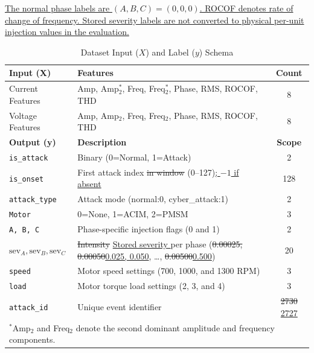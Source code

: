 \documentclass[conference,onecolumn,letterpaper]{IEEEtran} %
\providecommand{\DIFadd}[1]{{\protect\color{blue} \sf #1}} %
\providecommand{\DIFdel}[1]{{\protect\color{red} \scriptsize #1}} %
\providecommand{\DIFaddbegin}{} %
\providecommand{\DIFaddend}{} %
\providecommand{\DIFdelbegin}{} %
\providecommand{\DIFdelend}{} %
\providecommand{\DIFaddFL}[1]{\DIFadd{#1}} %
\providecommand{\DIFdelFL}[1]{\DIFdel{#1}} %
\providecommand{\DIFaddbeginFL}{} %
\providecommand{\DIFaddendFL}{} %
\providecommand{\DIFdelbeginFL}{} %
\providecommand{\DIFdelendFL}{} %
\renewcommand{\DIFadd}[1]{{\protect\color{blue}\protect\uline{#1}}}
\renewcommand{\DIFdel}[1]{{\protect\color{red}\protect\sout{#1}}}
\begin{document}
\DIFaddbegin \DIFadd{The normal phase labels are $(A,B,C)=(0,0,0)$. ROCOF denotes rate of change of frequency. Stored severity labels are not converted to physical per-unit injection values in the evaluation.
}\DIFaddend

\DIFdelbegin %
\DIFdelendFL \DIFaddbeginFL \begin{table}[!t]
\DIFaddendFL \centering
\caption{Dataset Input ($X$) and Label ($y$) Schema}
\label{tab:dataset_schema}
\begin{tabular}{l|l|c}
\hline
\textbf{Input (X)} & \textbf{Features} & \textbf{Count} \\ \hline
Current Features & Amp, Amp$_2^*$, Freq, Freq$_2^*$, Phase, RMS, ROCOF, THD & 8 \\
Voltage Features & Amp, Amp$_2$, Freq, Freq$_2$, Phase, RMS, ROCOF, THD & 8 \\ \hline
\textbf{Output (y)} & \textbf{Description} & \textbf{Scope} \\ 
\hline
\texttt{is\_attack} & Binary (0=Normal, 1=Attack) & 2 \\
\texttt{is\_onset} & First attack index \DIFdelbeginFL \DIFdelFL{in window }\DIFdelendFL (0--127)\DIFaddbeginFL \DIFaddFL{; $-1$ if absent }\DIFaddendFL & 128 \\
\texttt{attack\_type} & Attack mode (normal:0, cyber\_attack:1) & 2 \\
\texttt{Motor} & 0=None, 1=ACIM, 2=PMSM & 3 \\
\texttt{A, B, C} & Phase-specific injection flags (0 and 1) & 2 \\
$\text{sev}_A, \text{sev}_B, \text{sev}_C$ & \DIFdelbeginFL \DIFdelFL{Intensity }\DIFdelendFL \DIFaddbeginFL \DIFaddFL{Stored severity }\DIFaddendFL per phase (\DIFdelbeginFL \DIFdelFL{0.00025, 0.00050}\DIFdelendFL \DIFaddbeginFL \DIFaddFL{0.025, 0.050}\DIFaddendFL , \ldots, \DIFdelbeginFL \DIFdelFL{0.00500}\DIFdelendFL \DIFaddbeginFL \DIFaddFL{0.500}\DIFaddendFL ) & 20 \\
\texttt{speed} & Motor speed settings (700, 1000, and 1300 RPM) & 3 \\
\texttt{load} & Motor torque load settings (2, 3, and 4) & 3 \\
\texttt{attack\_id} & Unique event identifier & \DIFdelbeginFL \DIFdelFL{2730 }\DIFdelendFL \DIFaddbeginFL \DIFaddFL{2727 }\DIFaddendFL \\ \hline
\multicolumn{3}{l}{$^*$Amp$_2$ and Freq$_2$ denote the second dominant amplitude and frequency components.} \\
\end{tabular}
\DIFdelbeginFL %
\DIFdelend \DIFaddbegin \end{table}
\end{document}
